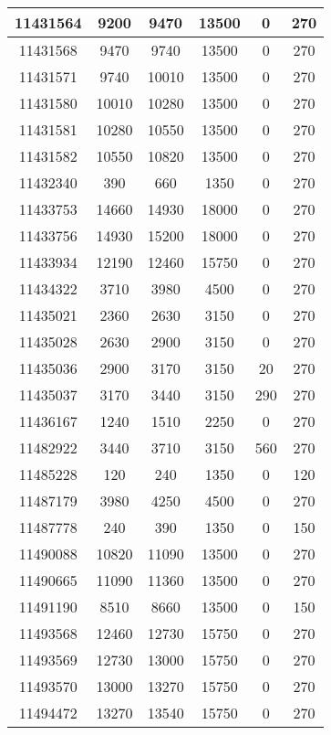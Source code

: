 \begin{appendices}
\begin{center}
\begin{longtable}{|c|c|c|c|c|c|}
11431564 & 9200  & 9470  & 13500 & 0     & 270 \\ \hline
11431568 & 9470  & 9740  & 13500 & 0     & 270 \\ \hline
11431571 & 9740  & 10010 & 13500 & 0     & 270 \\ \hline
11431580 & 10010 & 10280 & 13500 & 0     & 270 \\ \hline
11431581 & 10280 & 10550 & 13500 & 0     & 270 \\ \hline
11431582 & 10550 & 10820 & 13500 & 0     & 270 \\ \hline
11432340 & 390   & 660   & 1350  & 0     & 270 \\ \hline
11433753 & 14660 & 14930 & 18000 & 0     & 270 \\ \hline
11433756 & 14930 & 15200 & 18000 & 0     & 270 \\ \hline
11433934 & 12190 & 12460 & 15750 & 0     & 270 \\ \hline
11434322 & 3710  & 3980  & 4500  & 0     & 270 \\ \hline
11435021 & 2360  & 2630  & 3150  & 0     & 270 \\ \hline
11435028 & 2630  & 2900  & 3150  & 0     & 270 \\ \hline
11435036 & 2900  & 3170  & 3150  & 20    & 270 \\ \hline
11435037 & 3170  & 3440  & 3150  & 290   & 270 \\ \hline
11436167 & 1240  & 1510  & 2250  & 0     & 270 \\ \hline
11482922 & 3440  & 3710  & 3150  & 560   & 270 \\ \hline
11485228 & 120   & 240   & 1350  & 0     & 120 \\ \hline
11487179 & 3980  & 4250  & 4500  & 0     & 270 \\ \hline
11487778 & 240   & 390   & 1350  & 0     & 150 \\ \hline
11490088 & 10820 & 11090 & 13500 & 0     & 270 \\ \hline
11490665 & 11090 & 11360 & 13500 & 0     & 270 \\ \hline
11491190 & 8510  & 8660  & 13500 & 0     & 150 \\ \hline
11493568 & 12460 & 12730 & 15750 & 0     & 270 \\ \hline
11493569 & 12730 & 13000 & 15750 & 0     & 270 \\ \hline
11493570 & 13000 & 13270 & 15750 & 0     & 270 \\ \hline
11494472 & 13270 & 13540 & 15750 & 0     & 270 \\ \hline

\end{longtable}
\end{center}
\end{appendices}
